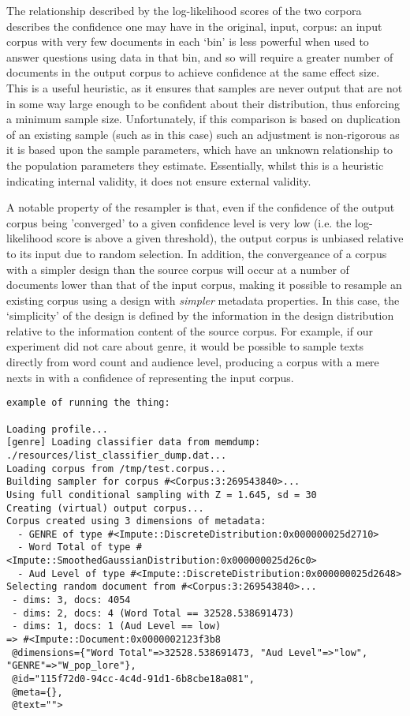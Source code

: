 The relationship described by the log-likelihood scores of the two corpora describes the confidence one may have in the original, input, corpus: an input corpus with very few documents in each `bin' is less powerful when used to answer questions using data in that bin, and so will require a greater number of documents in the output corpus to achieve confidence at the same effect size.  This is a useful heuristic, as it ensures that samples are never output that are not in some way large enough to be confident about their distribution, thus enforcing a minimum sample size.  Unfortunately, if this comparison is based on duplication of an existing sample (such as in this case) such an adjustment is non-rigorous as it is based upon the sample parameters, which have an unknown relationship to the population parameters they estimate.  Essentially, whilst this is a heuristic indicating internal validity, it does not ensure external validity.

A notable property of the resampler is that, even if the confidence of the output corpus being 'converged' to a given confidence level is very low (i.e. the log-likelihood score is above a given threshold), the output corpus is unbiased relative to its input due to random selection.  In addition, the convergeance of a corpus with a simpler design than the source corpus will occur at a number of documents lower than that of the input corpus, making it possible to resample an existing corpus using a design with \textit{simpler} metadata properties.  In this case, the `simplicity' of the design is defined by the information in the design distribution relative to the information content of the source corpus.  For example, if our experiment did not care about genre, it would be possible to sample texts directly from word count and audience level, producing a corpus with a mere  nexts in with a  confidence of representing the input corpus.






\begin{lstlisting}
example of running the thing:

Loading profile...
[genre] Loading classifier data from memdump: ./resources/list_classifier_dump.dat...
Loading corpus from /tmp/test.corpus...
Building sampler for corpus #<Corpus:3:269543840>...
Using full conditional sampling with Z = 1.645, sd = 30
Creating (virtual) output corpus...
Corpus created using 3 dimensions of metadata:
  - GENRE of type #<Impute::DiscreteDistribution:0x000000025d2710>
  - Word Total of type #<Impute::SmoothedGaussianDistribution:0x000000025d26c0>
  - Aud Level of type #<Impute::DiscreteDistribution:0x000000025d2648>
Selecting random document from #<Corpus:3:269543840>...
 - dims: 3, docs: 4054
 - dims: 2, docs: 4 (Word Total == 32528.538691473)
 - dims: 1, docs: 1 (Aud Level == low)
=> #<Impute::Document:0x0000002123f3b8
 @dimensions={"Word Total"=>32528.538691473, "Aud Level"=>"low", "GENRE"=>"W_pop_lore"},
 @id="115f72d0-94cc-4c4d-91d1-6b8cbe18a081",
 @meta={},
 @text="">
\end{lstlisting}




